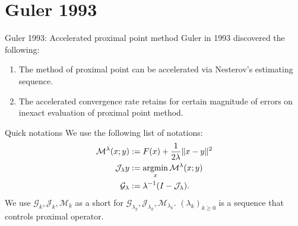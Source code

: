 \documentclass[11pt]{beamer}
\begin{document}
\section{Guler 1993}
    \begin{frame}{Guler 1993: Accelerated proximal point method}
        Guler in 1993 discovered the following: 
        \begin{enumerate}
            \item The method of proximal point can be accelerated via Nesterov's estimating sequence. 
            \item The accelerated convergence rate retains for certain magnitude of errors on inexact evaluation of proximal point method. 
        \end{enumerate}
        \begin{block}{Quick notations}
            We use the following list of notations: 
            \begin{align*}
                \mathcal M^{\lambda} (x; y) &:= F(x) + \frac{1}{2\lambda}\Vert x - y\Vert^2
                \\
                \mathcal J_\lambda y &:= \mathop{\rm argmin}\limits_x \mathcal M^{\lambda} (x; y)
                \\
                \mathcal G_\lambda &:= \lambda^{-1}(I - \mathcal J_\lambda). 
            \end{align*}
            We use $\mathcal G_k, \mathcal J_k, \mathcal M_k$ as a short for $\mathcal G_{\lambda_k}, \mathcal J_{\lambda_k}, \mathcal M_{\lambda_k}$. 
            $(\lambda_k)_{k \ge0}$ is a sequence that controls proximal operator. 
        \end{block}
    \end{frame}
\end{document}

